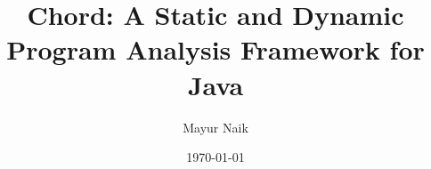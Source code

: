 \documentclass{article}
\title{Chord: A Static and Dynamic Program Analysis Framework for Java}
\author{Mayur Naik}
\date{\today}
\begin{document}
\maketitle


\texonly{\newpage}

\texonly{\newpage}

\texonly{\newpage}

\texonly{\newpage}

\texonly{\newpage}

\texonly{\newpage}

\texonly{\newpage}

\texonly{\newpage}

\texonly{\newpage}

\texonly{\newpage}

\texonly{\newpage}

\texonly{\newpage}

\texonly{\newpage}

\texonly{\newpage}

\texonly{\newpage}

\texonly{\newpage}

\end{document}
